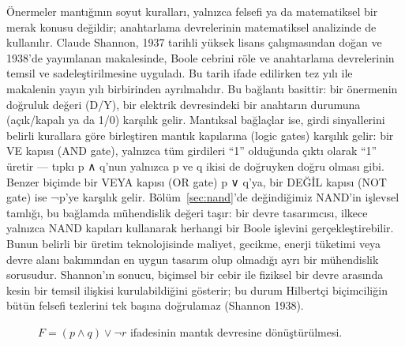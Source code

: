 Önermeler mantığının soyut kuralları, yalnızca felsefi ya da matematiksel bir merak konusu değildir; anahtarlama devrelerinin matematiksel analizinde de kullanılır. Claude Shannon, 1937 tarihli yüksek lisans çalışmasından doğan ve 1938’de yayımlanan makalesinde, Boole cebrini röle ve anahtarlama devrelerinin temsil ve sadeleştirilmesine uyguladı. Bu tarih ifade edilirken tez yılı ile makalenin yayın yılı birbirinden ayrılmalıdır. Bu bağlantı basittir: bir önermenin doğruluk değeri (D/Y), bir elektrik devresindeki bir anahtarın durumuna (açık/kapalı ya da 1/0) karşılık gelir. Mantıksal bağlaçlar ise, girdi sinyallerini belirli kurallara göre birleştiren mantık kapılarına (logic gates) karşılık gelir: bir VE kapısı (AND gate), yalnızca tüm girdileri “1” olduğunda çıktı olarak “1” üretir — tıpkı p ∧ q’nun yalnızca p ve q ikisi de doğruyken doğru olması gibi. Benzer biçimde bir VEYA kapısı (OR gate) p ∨ q’ya, bir DEĞİL kapısı (NOT gate) ise ¬p’ye karşılık gelir. Bölüm~\ref{sec:nand}’de değindiğimiz NAND’in işlevsel tamlığı, bu bağlamda mühendislik değeri taşır: bir devre tasarımcısı, ilkece yalnızca NAND kapıları kullanarak herhangi bir Boole işlevini gerçekleştirebilir. Bunun belirli bir üretim teknolojisinde maliyet, gecikme, enerji tüketimi veya devre alanı bakımından en uygun tasarım olup olmadığı ayrı bir mühendislik sorusudur. Shannon’ın sonucu, biçimsel bir cebir ile fiziksel bir devre arasında kesin bir temsil ilişkisi kurulabildiğini gösterir; bu durum Hilbertçi biçimciliğin bütün felsefi tezlerini tek başına doğrulamaz (Shannon 1938).

\begin{figure}[htbp]
\centering
{}
\caption{$F=(p\land q)\lor\neg r$ ifadesinin mantık devresine dönüştürülmesi.}
\end{figure}

